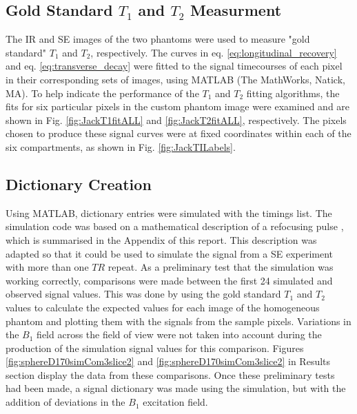 \documentclass[journal]{IEEEtran}
\begin{document}
\subsection{Gold Standard $T_1$ and $T_2$ Measurment}
The IR and SE images of the two phantoms were used to measure "gold standard" $T_1$ and $T_2$, respectively. The curves in eq. \eqref{eq:longitudinal_recovery} and eq. \eqref{eq:transverse_decay} were fitted to the signal timecourses of each pixel in their corresponding sets of images, using  MATLAB (The
MathWorks, Natick, MA). To help indicate the performance of the $T_1$ and $T_2$ fitting algorithms, the fits for six particular pixels in the custom phantom image were examined and are shown in Fig.  \ref{fig:JackT1fitALL} and \ref{fig:JackT2fitALL}, respectively. The pixels chosen to produce these signal curves were at fixed coordinates within each of the six compartments, as shown in Fig. \ref{fig:JackTILabels}. 



\subsection{Dictionary Creation} \label{Dictionary Creation}

Using MATLAB, dictionary entries were simulated with the timings list. The simulation code was based on a mathematical description of a refocusing pulse \cite{bernstein2004handbook}, which is summarised in the Appendix of this report. This description was adapted so that it could be used to simulate the signal from a SE experiment with more than one $TR$ repeat.
As a preliminary test that the simulation was working correctly, comparisons were made between the first 24 simulated and observed signal values. This was done by using the gold standard $T_1$ and $T_2$ values to calculate the expected values for each image of the homogeneous phantom and plotting them with the signals from the sample pixels. Variations in the $B_1$ field across the field of view were not taken into account during the production of the simulation signal values for this comparison. Figures \ref{fig:sphereD170simCom3slice2} and \ref{fig:sphereD170simCom3slice2} in Results section display the data from these comparisons. Once these preliminary tests had been made, a signal dictionary was made using the simulation, but with the addition of deviations in the $B_1$ excitation field.
\end{document}
